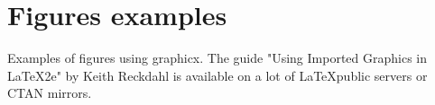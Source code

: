 \documentclass{aa}
\begin{document}


\section{Figures examples}
Examples of figures using graphicx. 
The guide "Using Imported Graphics in LaTeX2e" by Keith Reckdahl
is available on a lot of \LaTeX public servers or CTAN mirrors.
\end{document}
